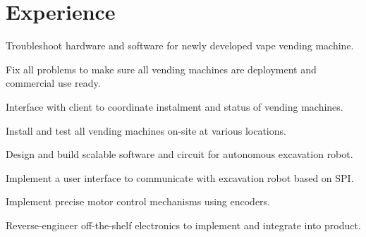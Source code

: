 \documentclass{deedy-resume-reversed}
\begin{document}
%
%

%
%

%
%

\begin{minipage}[t]{0.60\textwidth}


\section{Experience}
\vspace{\topsep} %
\begin{tightemize}
\item Troubleshoot hardware and software for newly developed vape vending machine.
\item Fix all problems to make sure all vending machines are deployment and commercial use ready.
\item Interface with client to coordinate instalment and status of vending machines.
\item Install and test all vending machines on-site at various locations.
\end{tightemize}
\sectionsep

\begin{tightemize}
\item Design and build scalable software and circuit for autonomous excavation robot.
\item Implement a user interface to communicate with excavation robot based on SPI.
\item Implement precise motor control mechanisms using encoders.
\item Reverse-engineer off-the-shelf electronics to implement and integrate into product.
\end{tightemize}
\sectionsep


\end{minipage}
\end{document}
